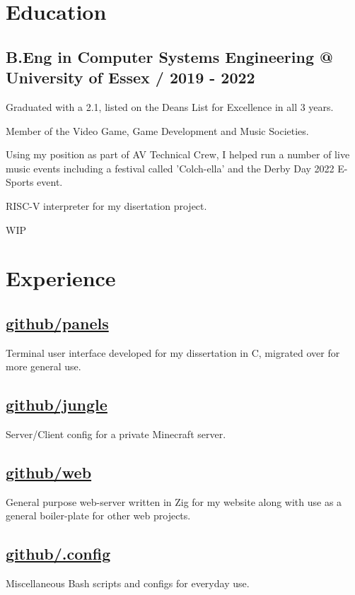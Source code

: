 \documentclass{article}
\newcommand{\github}{https://github.com/mskorczak}
\begin{document}
\section{Education}

\subsection{B.Eng in Computer Systems Engineering @ University of Essex / 2019 - 2022}
\begin{compactitem}
\item Graduated with a 2.1, listed on the Deans List for Excellence in all 3 years.
\item Member of the Video Game, Game Development and Music Societies.
\item Using my position as part of AV Technical Crew, I helped run a number of live music events including a festival called 'Colch-ella' and the Derby Day 2022 E-Sports event.
\item RISC-V interpreter for my disertation project.
\item WIP
\end{compactitem}

\section{Experience}

\subsection{\href{\github/panels}{github/panels}} Terminal user interface developed for my dissertation in C, migrated over for more general use.
\subsection{\href{\github/jungle}{github/jungle}} Server/Client config for a private Minecraft server.
\subsection{\href{\github/web}{github/web}} General purpose web-server written in Zig for my website along with use as a general boiler-plate for other web projects.
\subsection{\href{\github/.config}{github/.config}} Miscellaneous Bash scripts and configs for everyday use.  
\end{document}
